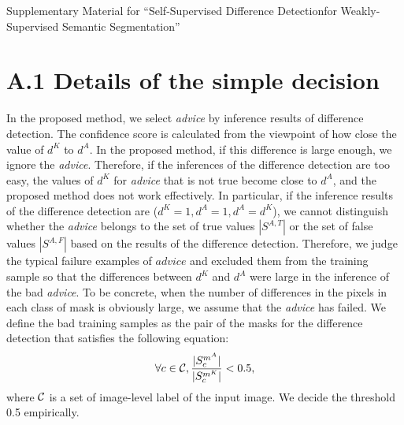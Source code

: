 \documentclass[10pt,twocolumn,letterpaper]{article}
\begin{document}
{\small


}

\setcounter{table}{0}
\renewcommand{\thetable}{A-\arabic{table}}

\newpage
\onecolumn
\noindent
{\huge Supplementary Material for ``Self-Supervised Difference Detectionfor Weakly-Supervised Semantic Segmentation''}

\section*{A.1 Details of the simple decision}
In the proposed method, we select {\it advice} by inference results of difference detection.
The confidence score is calculated from the viewpoint of how close the value of $d^{K} $ to $d^{A} $. 
In the proposed method, if this difference is large enough, we ignore the {\it advice}.
Therefore, if the inferences of the difference detection are too easy, the values of $ d^{K} $ for {\it advice} that is not true become close to $d^{A} $, and the proposed method does not work effectively. 
In particular, if the inference results of the difference detection are ($d^{K} = 1, d^{A} = 1, d^{A} = d^{K}$), we cannot distinguish whether the {\it advice} belongs to the set of true values $|S^{A,T}|$ or the set of false values $|S^{A,F}|$ based on the results of the difference detection.
Therefore, we judge the typical failure examples of $ advice $ and excluded them from the training sample so that the differences between $d^{K}$ and $d^{A}$ were large in the inference of the bad {\it advice}.
To be concrete, when the number of differences in the pixels in each class of mask is obviously large, we assume that the {\it advice} has failed.
We define the bad training samples as the pair of the masks for the difference detection that satisfies the following equation:
\begin{equation}
\forall c \in {\cal C}, \frac{|S^{m^{A}}_{c}|}{|S^{m^{K}}_{c}|}<0.5,
\end{equation}
where ${\cal C}$ is a set of image-level label of the input image.
We decide the threshold 0.5 empirically.
\end{document}
